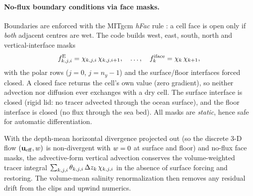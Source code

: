 \paragraph{No-flux boundary conditions via face masks.}
Boundaries are enforced with the MITgcm \emph{hFac} rule \citep{adcroft1997}: a cell face is
open only if \emph{both} adjacent centres are wet. The code builds west,
east, south, north and vertical-interface masks
\begin{equation}
  f^{\mathrm{E}}_{k,j,i} = \chi_{k,j,i}\,\chi_{k,j,i+1},\quad\dots,\quad
  f^{\mathrm{iface}}_{k} = \chi_{k}\,\chi_{k+1},
  \label{eq:facemask}
\end{equation}
with the polar rows ($j=0$, $j=n_y-1$) and the surface/floor interfaces
forced closed. A closed face returns the cell's own value (zero gradient),
so neither advection nor diffusion ever exchanges with a dry cell. The
surface interface is closed (rigid lid: no tracer advected through the
ocean surface), and the floor interface is closed (no flux through the sea
bed). All masks are \emph{static}, hence safe for automatic differentiation.

\begin{proposition}
With the depth-mean horizontal divergence projected out (so the discrete
3-D flow $(\mathbf{u}_{\mathrm{eff}},w)$ is non-divergent with $w=0$ at
surface and floor) and no-flux face masks, the advective-form vertical
advection conserves the volume-weighted tracer integral
$\sum_{k,j,i}\theta_{k,j,i}\,\Delta z_k\,\chi_{k,j,i}$ in the absence of
surface forcing and restoring. The volume-mean salinity renormalization then
removes any residual drift from the clips and upwind numerics.
\end{proposition}

